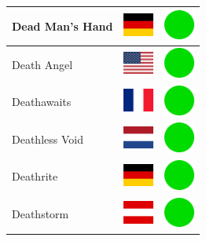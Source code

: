 \documentclass[12pt, a4paper, twoside]{report}
\begin{document}
\begin{center}
\begin{longtable}{|p{5cm}|p{2cm}|p{2cm}|}
 Dead Man's Hand                                            & \includegraphics[width=1cm]{../4x3/de} &   \includegraphics[width=1cm]{../likes/y} \\ \hline
 Death Angel                                                & \includegraphics[width=1cm]{../4x3/us} &   \includegraphics[width=1cm]{../likes/y} \\ \hline
 Deathawaits                                                & \includegraphics[width=1cm]{../4x3/fr} &   \includegraphics[width=1cm]{../likes/y} \\ \hline
 Deathless Void                                             & \includegraphics[width=1cm]{../4x3/nl} &   \includegraphics[width=1cm]{../likes/y} \\ \hline
 Deathrite                                                  & \includegraphics[width=1cm]{../4x3/de} &   \includegraphics[width=1cm]{../likes/y} \\ \hline
 Deathstorm                                                 & \includegraphics[width=1cm]{../4x3/at} &   \includegraphics[width=1cm]{../likes/y} \\ \hline

\end{longtable}
\end{center}
\end{document}
